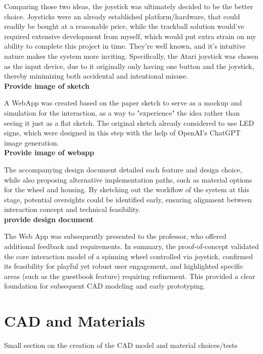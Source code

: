 Comparing those two ideas, the joystick was ultimately decided to be the better choice. Joysticks were an already established platform/hardware, that could readily be bought at a reasonable price, while the trackball solution would've required extensive development from myself, which would put extra strain on my ability to complete this project in time. They're well known, and it's intuitive nature makes the system more inviting.
Specifically, the Atari joystick was chosen as the input device, due to it originally only having one button and the joystick, thereby minimizing both accidental and intentional misuse.\\ 
\textbf{Provide image of sketch}

A WebApp was created based on the paper sketch to serve as a mockup and simulation for the interaction, as a way to "experience" the idea rather than seeing it just as a flat sketch. The original sketch already considered to use LED signs, which were designed in this step with the help of OpenAI's ChatGPT image generation.\\
\textbf{Provide image of webapp}

The accompanying design document detailed each feature and design choice, while also proposing alternative implementation paths, such as material options for the wheel and housing. By sketching out the workflow of the system at this stage, potential oversights could be identified early, ensuring alignment between interaction concept and technical feasibility.\\
\textbf{provide design document}

The Web App was subsequently presented to the professor, who offered additional feedback and requirements. 
In summary, the proof-of-concept validated the core interaction model of a spinning wheel controlled via joystick, confirmed its feasibility for playful yet robust user engagement, and highlighted specific areas (such as the guestbook feature) requiring refinement. This provided a clear foundation for subsequent CAD modeling and early prototyping.\\

\section{CAD and Materials}
Small section on the creation of the CAD model and material choices/tests
 
